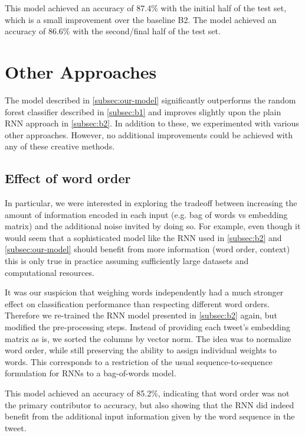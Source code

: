 \documentclass[10pt,conference,compsocconf]{IEEEtran}
\begin{document}
This model achieved an accuracy of 87.4\% with the initial half of the test set,
which is a small improvement over the baseline B2.
The model achieved an accuracy of 86.6\% with the second/final half of the test set.

\section{Other Approaches} \label{sec:other}

The model described in \autoref{subsec:our-model} significantly outperforms
the random forest classifier described in \autoref{subsec:b1} and improves
slightly upon the plain RNN approach in \autoref{subsec:b2}. In addition to
these, we experimented with various other approaches.
However, no additional improvements could be achieved with
any of these creative methods.

\subsection*{Effect of word order}

In particular, we were interested in exploring the tradeoff between
increasing the amount of information encoded in each input (e.g. bag
of words vs embedding matrix) and the additional noise invited by
doing so. For example, even though it would seem that a sophisticated
model like the RNN used in \autoref{subsec:b2} and \autoref{subsec:our-model}
should benefit from more information (word order, context) this is only true
in practice assuming sufficiently large datasets and computational
resources.

It was our suspicion that weighing words independently had a much
stronger effect on classification performance than respecting
different word orders. Therefore we re-trained the RNN model presented
in \autoref{subsec:b2} again, but modified the pre-processing
steps. Instead of providing each tweet's embedding matrix as is, we
sorted the columns by vector norm. The idea was to normalize word
order, while still preserving the ability to assign individual weights
to words. This corresponds to a restriction of the usual
sequence-to-sequence formulation for RNNs to a bag-of-words model.

This model achieved an accuracy of 85.2\%, indicating that word order
was not the primary contributor to accuracy, but also showing that the
RNN did indeed benefit from the additional input information given by
the word sequence in the tweet.
\end{document}
